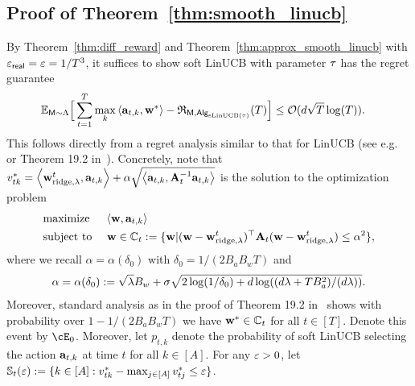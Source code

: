 \subsection{Proof of Theorem~\ref{thm:smooth_linucb}}\label{sec:pf_thm:smooth_linucb}

By Theorem~\ref{thm:diff_reward} and Theorem~\ref{thm:approx_smooth_linucb} with ${{\varepsilon}_{\sf real}=\varepsilon=1/{T}^3}$, it suffices to show soft LinUCB with parameter ${\tau}$ has the regret guarantee \begin{align*}
\mathbb{E}_{{\mathsf{M}}\sim{\Lambda}}\Big[\sum_{t=1}^{T}\max_{k}\left\langle{\mathbf a}_{t,k},{\mathbf w}^*\right\rangle-{\mathfrak{R}}_{{\mathsf{M}},{\mathsf{Alg}}_{{\mathrm{sLinUCB}}({\tau})}}({T})\Big]&\leq\mathcal{O}(d\sqrt{T}\log(T)).
\end{align*}
This follows directly from a  regret analysis similar to  that for LinUCB (see e.g.~\cite{chu2011contextual} or  Theorem 19.2 in~\cite{lattimore2020bandit}). Concretely, note that $v_{tk}^*=\left\langle{\mathbf w}^t_{{\rm ridge},\lambda},{\mathbf a}_{t,k}\right\rangle+\alpha\sqrt{\left\langle{\mathbf a}_{t,k}, {{\mathbf A}_t^{-1} {\mathbf a}_{t,k}}\right\rangle}$ is the solution to the optimization problem 
\begin{align*}&\text{maximize }~~~\left\langle{\mathbf w},{\mathbf a}_{t,k}\right\rangle
\\
&\text{subject to }~~~{\mathbf w}\in {\mathbb{C}}_t:=\{{\mathbf w}|({\mathbf w}-{\mathbf w}^t_{{\rm ridge},\lambda})^\top{\mathbf A}_t({\mathbf w}-{\mathbf w}^t_{{\rm ridge},\lambda})\leq\alpha^2\},
\end{align*}
where we recall $\alpha=\alpha(\delta_0)$ with $\delta_0=1/(2B_aB_wT)$ and
\begin{align}
{\alpha}={\alpha}(\delta_0):=\sqrt{\lambda}B_w+\sigma\sqrt{2\log(1/\delta_0)+d\log((d\lambda+TB_a^2)/(d\lambda))}.\label{eq:recall_alpha_formula}
\end{align}
Moreover, standard analysis as in the proof of Theorem 19.2 in~\cite{lattimore2020bandit} shows with probability over $1-1/(2B_aB_wT)$ we have ${\mathbf w}^*\in{\mathbb{C}}_t$ for all $t\in[T]$. Denote this event by $\cE_0$. Moreover, let $p_{t,k}$ denote the probability of soft LinUCB selecting the action ${\mathbf a}_{t,k}$ at time $t$ for all $k\in[A]$.  For any $\varepsilon>0$, let ${\mathbb{S}}_t(\varepsilon):=\{k\in[A]:v^*_{tk}-\max_{j\in[A]}v^*_{tj}\leq \varepsilon\}$. 

